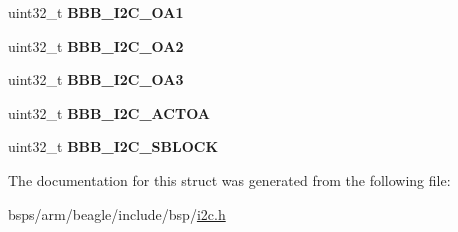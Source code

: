 \begin{DoxyCompactItemize}
\item 
\mbox{\label{structi2c__regs_a8fff02fc1d0b01cf2a4aad4b18092cd8}} 
uint32\+\_\+t {\bfseries B\+B\+B\+\_\+\+I2\+C\+\_\+\+O\+A1}
\item 
\mbox{\label{structi2c__regs_ad385bc8036b48f642935ad6ba62797d0}} 
uint32\+\_\+t {\bfseries B\+B\+B\+\_\+\+I2\+C\+\_\+\+O\+A2}
\item 
\mbox{\label{structi2c__regs_a8f50c92612f9bda7c2afa268f824cf32}} 
uint32\+\_\+t {\bfseries B\+B\+B\+\_\+\+I2\+C\+\_\+\+O\+A3}
\item 
\mbox{\label{structi2c__regs_a944a5ff1b66ad32b7c9d8ee25a0f9b41}} 
uint32\+\_\+t {\bfseries B\+B\+B\+\_\+\+I2\+C\+\_\+\+A\+C\+T\+OA}
\item 
\mbox{\label{structi2c__regs_a35ecd5c8a14e9222fa181994be079145}} 
uint32\+\_\+t {\bfseries B\+B\+B\+\_\+\+I2\+C\+\_\+\+S\+B\+L\+O\+CK}
\end{DoxyCompactItemize}


The documentation for this struct was generated from the following file\+:\begin{DoxyCompactItemize}
\item 
bsps/arm/beagle/include/bsp/\mbox{\hyperlink{bsps_2arm_2beagle_2include_2bsp_2i2c_8h}{i2c.\+h}}\end{DoxyCompactItemize}
